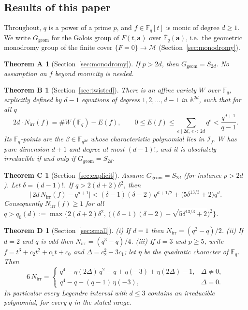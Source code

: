 \documentclass[11pt,a4paper]{article}
\newtheorem*{theoremA}{Theorem A}
\newtheorem*{theoremB}{Theorem B}
\newtheorem*{theoremC}{Theorem C}
\newtheorem*{theoremD}{Theorem D}
\theoremstyle{definition}
\theoremstyle{remark}
\newcommand{\Fq}{\mathbb{F}_q}
\newcommand{\Fqbar}{\overline{\mathbb{F}}_q}
\newcommand{\A}{\mathbb{A}}
\newcommand{\Ggeom}{G_{\mathrm{geom}}}
\newcommand{\Nirr}{N_{\mathrm{irr}}}
\newcommand{\cI}{\mathcal{I}}
\newcommand{\cM}{\mathcal{M}}
\newcommand{\ba}{\mathbf{a}}
\begin{document}
\subsection{Results of this paper}
Throughout, $q$ is a power of a prime $p$, and $f\in\Fq[t]$ is monic of degree $d\ge1$.
We write $\Ggeom$ for the Galois group of $F(t,\ba)$ over $\Fqbar(\ba)$,
i.e.\ the geometric monodromy group of the finite cover
$\{F=0\}\to\cM$ (Section~\ref{sec:monodromy}).

\begin{theoremA}[Section~\ref{sec:monodromy}]
If $p>2d$, then $\Ggeom=S_{2d}$. No assumption on $f$ beyond monicity is needed.
\end{theoremA}

\begin{theoremB}[Section~\ref{sec:twisted}]
There is an affine variety $W$ over $\Fq$, explicitly defined by $d-1$
equations of degrees $1,2,\dots,d-1$ in $\A^{2d}$, such that for all $q$
\[
  2d\cdot\Nirr(f)=\#W(\Fq)-E(f),\qquad 0\le E(f)\le\sum_{e\mid 2d,\ e<2d}q^e<\frac{q^{d+1}}{q-1}.
\]
Its $\Fq$-points are the $\beta\in\mathbb{F}_{q^{2d}}$ whose characteristic polynomial lies in $\cI_f$.
$W$ has pure dimension $d+1$ and degree at most $(d-1)!$, and it is
absolutely irreducible if and only if $\Ggeom=S_{2d}$.
\end{theoremB}

\begin{theoremC}[Section~\ref{sec:explicit}]
Assume $\Ggeom=S_{2d}$ (for instance $p>2d$). Let $\delta=(d-1)!$. If $q>2(d+2)\delta^2$, then
\[
  \bigl|\,2d\,\Nirr(f)-q^{d+1}\bigr|
  <(\delta-1)(\delta-2)\,q^{d+1/2}+\bigl(5\delta^{13/3}+2\bigr)q^{d}.
\]
Consequently $\Nirr(f)\ge1$ for all $q>q_0(d):=\max\bigl\{2(d+2)\delta^2,\ \bigl((\delta-1)(\delta-2)+\sqrt{5\delta^{13/3}+2}\bigr)^2\bigr\}$.
\end{theoremC}

\begin{theoremD}[Section~\ref{sec:small}]
(i) If $d=1$ then $\Nirr=(q^2-q)/2$.
(ii) If $d=2$ and $q$ is odd then $\Nirr=(q^3-q)/4$.
(iii) If $d=3$ and $p\ge5$, write $f=t^3+c_2t^2+c_1t+c_0$ and $\Delta=c_2^2-3c_1$; let $\eta$
be the quadratic character of $\Fq$. Then
\[
 6\,\Nirr=\begin{cases}
 q^4-\eta(2\Delta)\,q^2-q+\eta(-3)+\eta(2\Delta)-1, & \Delta\ne0,\\[2pt]
 q^4-q-(q-1)\,\eta(-3), & \Delta=0.
 \end{cases}
\]
In particular every Legendre interval with $d\le3$ contains an irreducible
polynomial, for every $q$ in the stated range.
\end{theoremD}
\end{document}
